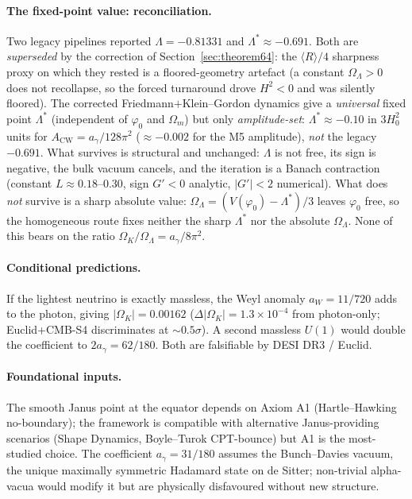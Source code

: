 \documentclass[11pt,a4paper]{article}
\theoremstyle{plain}
\theoremstyle{definition}
\theoremstyle{remark}
\newcommand{\Ok}{\Omega_K}
\newcommand{\OL}{\Omega_\Lambda}
\newcommand{\ag}{a_\gamma}
\begin{document}
\paragraph{The fixed-point value: reconciliation.}
Two legacy pipelines reported $\Lambda = -0.81331$ and $\Lambda^* \approx -0.691$. Both are
\emph{superseded} by the correction of Section~\ref{sec:theorem64}: the $\langle R\rangle/4$
sharpness proxy on which they rested is a floored-geometry artefact (a constant $\OL>0$ does not
recollapse, so the forced turnaround drove $H^2<0$ and was silently floored). The corrected
Friedmann$+$Klein--Gordon dynamics give a \emph{universal} fixed point $\Lambda^*$ (independent of
$\varphi_0$ and $\Omega_m$) but only \emph{amplitude-set}: $\Lambda^*\approx-0.10$ in $3H_0^2$ units
for $A_{\mathrm{CW}}=\ag/128\pi^2$ ($\approx-0.002$ for the M5 amplitude), \emph{not} the legacy
$-0.691$. What survives is structural and unchanged: $\Lambda$ is not free, its sign is negative,
the bulk vacuum cancels, and the iteration is a Banach contraction (constant $L\approx0.18$--$0.30$,
sign $G'<0$ analytic, $|G'|<2$ numerical). What does \emph{not} survive is a sharp absolute value:
$\OL=(V(\varphi_0)-\Lambda^*)/3$ leaves $\varphi_0$ free, so the homogeneous route fixes neither the
sharp $\Lambda^*$ nor the absolute $\OL$. None of this bears on the ratio $\Ok/\OL=\ag/8\pi^2$.

\paragraph{Conditional predictions.}
If the lightest neutrino is exactly massless, the Weyl anomaly $a_W = 11/720$ adds to the photon,
giving $|\Ok| = 0.00162$ ($\Delta|\Ok| = 1.3\times10^{-4}$ from photon-only; Euclid+CMB-S4
discriminates at $\sim0.5\sigma$). A second massless $U(1)$ would double the coefficient to
$2\ag = 62/180$. Both are falsifiable by DESI DR3 / Euclid.

\paragraph{Foundational inputs.}
The smooth Janus point at the equator depends on Axiom A1 (Hartle--Hawking no-boundary); the
framework is compatible with alternative Janus-providing scenarios (Shape Dynamics, Boyle--Turok
CPT-bounce) but A1 is the most-studied choice. The coefficient $\ag = 31/180$ assumes the
Bunch--Davies vacuum, the unique maximally symmetric Hadamard state on de Sitter; non-trivial
alpha-vacua would modify it but are physically disfavoured without new structure.
\end{document}
